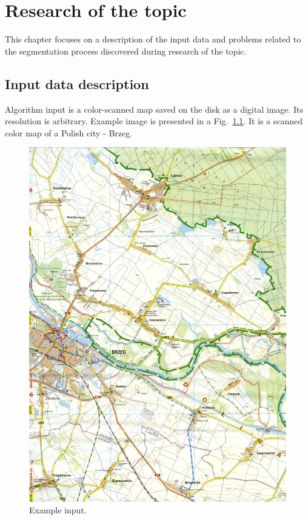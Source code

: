 \documentclass[a4paper,onecolumn,oneside,12pt]{memoir}
\begin{document}
\chapter{Research of the topic}

This chapter focuses on a description of the input data and problems related to the segmentation
process discovered during research of the topic.

\section{Input data description}

Algorithm input is a color-scanned map saved on the disk as a digital image. Its resolution is
arbitrary. Example image is presented in a Fig.~\ref{inputExample}. It is a scanned color map of a
Polish city - Brzeg.

\begin{figure}[!ht]
\begin{center}
\includegraphics[scale=0.78]{images/brzeg.jpg}
\caption{Example input.}
\label{inputExample}
\end{center}
\end{figure}
\end{document}
